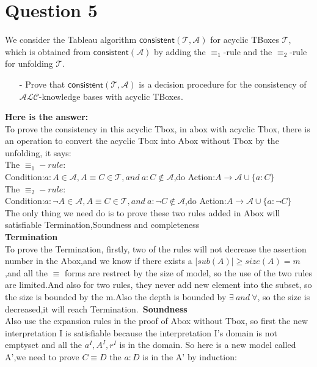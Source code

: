 \documentclass{article}
\begin{document}
    \section{Question 5}
    We consider the Tableau algorithm $\textsf{consistent}(\mathcal{T},\mathcal{A})$ for acyclic TBoxes $\mathcal{T}$, which is obtained from $\textsf{consistent}(\mathcal{A})$ by adding the $\equiv_{1}$-rule and the $\equiv_{2}$-rule for unfolding $\mathcal{T}$.
    \begin{itemize}
        \item[-] Prove that $\textsf{consistent}(\mathcal{T},\mathcal{A})$ is a decision procedure for the consistency of $\mathcal{ALC}$-knowledge bases with acyclic TBoxes.
    \end{itemize}
    \textbf{Here is the answer:}\\
    To prove the consistency in this acyclic Tbox, in abox with acyclic Tbox, there is an operation to convert the acyclic Tbox 
    into Abox without Tbox by the unfolding, it says:\\
    The $\equiv_1 -rule$:\\
    Condition:$a:A\in \mathcal{A} ,A\equiv C\in \mathcal{T},and\ a:C \notin \mathcal{A}$,do Action:$A\rightarrow \mathcal{A}\cup \{a:C\}$\\
    The $\equiv_2 -rule$:\\
    Condition:$a:\neg A\in \mathcal{A} ,A\equiv C\in \mathcal{T},and\ a:\neg C \notin \mathcal{A}$,do Action:$A\rightarrow \mathcal{A}\cup \{a:\neg C\}$\\
    The only thing we need do is to prove these two rules added in Abox will satisfiable Termination,Soundness and completeness\\
    \textbf{Termination}\\
    To prove the Termination, firstly, two of the rules will not decrease the assertion number in the Abox,and we know if there exists a $|sub(A)| \geq size(A) = m$,and 
    all the $\equiv$ forms are restrect by the size of model, so the use of the two rules are limited.And also for two rules, they never add new element into the subset, so
    the size is bounded by the m.Also the depth is bounded by $\exists\ and\ \forall$, so the size is decreased,it will reach Termination.\
    \textbf{Soundness}\\
    Also use the expansion rules in the proof of Abox without Tbox, so first the new interpretation I is satisfiable because the interpretation I's domain is not emptyset
    and all the $a^I,A^I,r^I$ is in the domain. So here is a new model called A',we need to prove $C\equiv D$ the $a:D$ is in the A' by induction:\\
\end{document}
